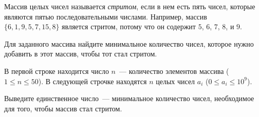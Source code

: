 Массив целых чисел называется \textit{стритом}, если в нем есть пять чисел,
которые являются пятью последовательными числами. Например, массив $\{ 6, 1, 9,
5, 7, 15, 8 \}$ является стритом, потому что он содержит $5$, $6$, $7$, $8$,
и $9$.

Для заданного массива найдите минимальное количество чисел, которое нужно
добавить в этот массив, чтобы тот стал стритом.

\InputFile

В первой строке находится число $n$~--- количество элементов массива ($1 \le
n \le 50$). В следующей строчке находятся $n$ целых чисел $a_i$ ($0 \le a_i \le
10^9$).

\OutputFile

Выведите единственное число~--- минимальное количество чисел, необходимое для
того, чтобы массив стал стритом.

\SAMPLES
